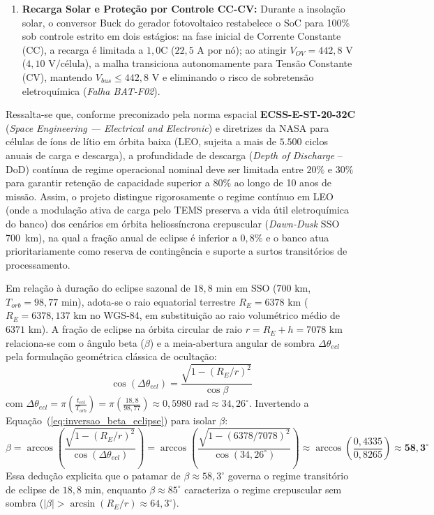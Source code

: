 \begin{enumerate}[label=(\alph*),leftmargin=*]
    \item \textbf{Recarga Solar e Proteção por Controle CC-CV:} Durante a insolação solar, o conversor Buck do gerador fotovoltaico restabelece o SoC para 100\% sob controle estrito em dois estágios: na fase inicial de Corrente Constante (CC), a recarga é limitada a $1{,}0\text{C}$ ($22{,}5\text{ A}$ por nó); ao atingir $V_{OV} = 442{,}8\text{ V}$ ($4{,}10\text{ V/célula}$), a malha transiciona autonomamente para Tensão Constante (CV), mantendo $V_{bus} \le 442{,}8\text{ V}$ e eliminando o risco de sobretensão eletroquímica (\textit{Falha BAT-F02}).
\end{enumerate}
Ressalta-se que, conforme preconizado pela norma espacial \textbf{ECSS-E-ST-20-32C} (\textit{Space Engineering --- Electrical and Electronic}) e diretrizes da NASA para células de íons de lítio em órbita baixa (LEO, sujeita a mais de $5.500$ ciclos anuais de carga e descarga), a profundidade de descarga (\textit{Depth of Discharge} -- DoD) contínua de regime operacional nominal deve ser limitada entre $20\%\text{ e }30\%$ para garantir retenção de capacidade superior a $80\%$ ao longo de 10 anos de missão. Assim, o projeto distingue rigorosamente o regime contínuo em LEO (onde a modulação ativa de carga pelo TEMS preserva a vida útil eletroquímica do banco) dos cenários em órbita heliossíncrona crepuscular (\textit{Dawn-Dusk} SSO 700~km), na qual a fração anual de eclipse é inferior a $0{,}8\%$ e o banco atua prioritariamente como reserva de contingência e suporte a surtos transitórios de processamento.

Em relação à duração do eclipse sazonal de $18{,}8\text{ min}$ em SSO ($700\text{ km}$, $T_{orb} = 98{,}77\text{ min}$), adota-se o raio equatorial terrestre $R_E = 6378\text{ km}$ ($R_E = 6378{,}137\text{ km}$ no WGS-84, em substituição ao raio volumétrico médio de $6371\text{ km}$). A fração de eclipse na órbita circular de raio $r = R_E + h = 7078\text{ km}$ relaciona-se com o ângulo beta ($\beta$) e a meia-abertura angular de sombra $\Delta\theta_{ecl}$ pela formulação geométrica clássica de ocultação:
\begin{equation}
    \cos(\Delta \theta_{ecl}) = \frac{\sqrt{1 - (R_E / r)^2}}{\cos \beta}
    \label{eq:inversao_beta_eclipse}
\end{equation}
com $\Delta \theta_{ecl} = \pi \left(\frac{t_{ecl}}{T_{orb}}\right) = \pi \left(\frac{18{,}8}{98{,}77}\right) \approx 0{,}5980\text{ rad} \approx 34{,}26^\circ$. Invertendo a Equação~(\ref{eq:inversao_beta_eclipse}) para isolar $\beta$:
\begin{equation}
    \beta = \arccos\left( \frac{\sqrt{1 - (R_E / r)^2}}{\cos(\Delta \theta_{ecl})} \right) = \arccos\left( \frac{\sqrt{1 - (6378 / 7078)^2}}{\cos(34{,}26^\circ)} \right) \approx \arccos\left(\frac{0{,}4335}{0{,}8265}\right) \approx \mathbf{58{,}3^\circ}
\end{equation}
Essa dedução explicita que o patamar de $\beta \approx 58{,}3^\circ$ governa o regime transitório de eclipse de $18{,}8\text{ min}$, enquanto $\beta \approx 85^\circ$ caracteriza o regime crepuscular sem sombra ($|\beta| > \arcsin(R_E/r) \approx 64{,}3^\circ$).

